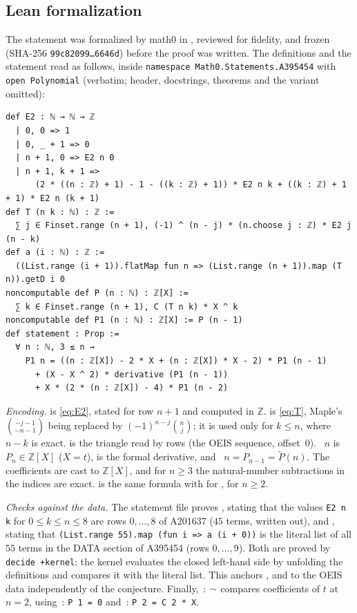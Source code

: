 \documentclass[11pt]{amsart}
\theoremstyle{plain}
\theoremstyle{definition}
\newcommand{\Z}{\mathbb{Z}}
\newcommand{\tP}{\widetilde P}
\begin{document}
\subsection*{Lean formalization}
The statement was formalized by math0 in , reviewed for fidelity, and frozen (SHA-256 \texttt{99c82099\ldots 6646d}) before the proof was written. The definitions and the statement read as follows, inside \texttt{namespace Math0.Statements.A395454} with \texttt{open Polynomial} (verbatim; header, docstrings, theorems and the variant  omitted):
\begin{lstlisting}
def E2 : ℕ → ℕ → ℤ
  | 0, 0 => 1
  | 0, _ + 1 => 0
  | n + 1, 0 => E2 n 0
  | n + 1, k + 1 =>
      (2 * ((n : ℤ) + 1) - 1 - ((k : ℤ) + 1)) * E2 n k + ((k : ℤ) + 1 + 1) * E2 n (k + 1)
def T (n k : ℕ) : ℤ :=
  ∑ j ∈ Finset.range (n + 1), (-1) ^ (n - j) * (n.choose j : ℤ) * E2 j (n - k)
def a (i : ℕ) : ℤ :=
  ((List.range (i + 1)).flatMap fun n => (List.range (n + 1)).map (T n)).getD i 0
noncomputable def P (n : ℕ) : ℤ[X] :=
  ∑ k ∈ Finset.range (n + 1), C (T n k) * X ^ k
noncomputable def P1 (n : ℕ) : ℤ[X] := P (n - 1)
def statement : Prop :=
  ∀ n : ℕ, 3 ≤ n →
    P1 n = ((n : ℤ[X]) - 2 * X + (n : ℤ[X]) * X - 2) * P1 (n - 1)
      + (X - X ^ 2) * derivative (P1 (n - 1))
      + X * (2 * (n : ℤ[X]) - 4) * P1 (n - 2)
\end{lstlisting}
\emph{Encoding.}  is \eqref{eq:E2}, stated for row $n+1$ and computed in $\Z$.  is \eqref{eq:T}, Maple's $\binom{-j-1}{-n-1}$ being replaced by $(-1)^{n-j}\binom nj$; it is used only for $k\le n$, where $n-k$ is exact.  is the triangle read by rows (the OEIS sequence, offset~$0$). ~$n$ is $P_n\in\Z[X]$ ($X=t$),  is the formal derivative, and ~$n=P_{n-1}=\tP(n)$. The coefficients are cast to $\Z[X]$, and for $n\ge3$ the natural-number subtractions in the indices are exact.  is the same formula with  for , for $n\ge2$.

\emph{Checks against the data.} The statement file proves , stating that the values \texttt{E2 n k} for $0\le k\le n\le8$ are rows $0,\dots,8$ of A201637 ($45$ terms, written out), and , stating that \texttt{(List.range 55).map (fun i => a (i + 0))} is the literal list of all $55$ terms in the DATA section of A395454 (rows $0,\dots,9$). Both are proved by \texttt{decide +kernel}: the kernel evaluates the closed left-hand side by unfolding the definitions and compares it with the literal list. This anchors ,  and  to the OEIS data independently of the conjecture. Finally, \,: $\neg$\, compares coefficients of $t$ at $n=2$, using \,: \texttt{P 1 = 0} and \,: \texttt{P 2 = C 2 * X}.
\end{document}
